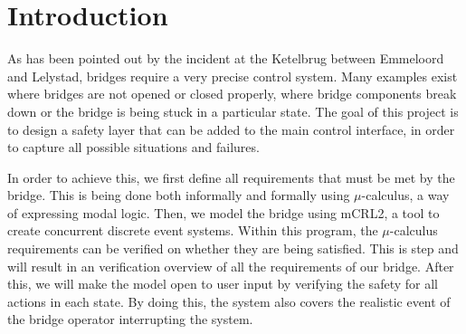 \section{Introduction}

As has been pointed out by the incident at the Ketelbrug between Emmeloord and Lelystad, bridges require a very precise control system.  Many examples exist where bridges are not opened or closed properly, where bridge components break down or the bridge is being stuck in a particular state. The goal of this project is to design a safety layer that can be added to the main control interface, in order to capture all possible situations and failures.

In order to achieve this, we first define all requirements that must be met by the bridge. This is being done both informally and formally using $\mu$-calculus, a way of expressing modal logic. Then, we model the bridge using mCRL2, a tool to create concurrent discrete event systems. Within this program, the $\mu$-calculus requirements can be verified on whether they are being satisfied. This is step and will result in an verification overview of all the requirements of our bridge. After this, we will make the model open to user input by verifying the safety for all actions in each state. By doing this, the system also covers the realistic event of the bridge operator interrupting the system.

